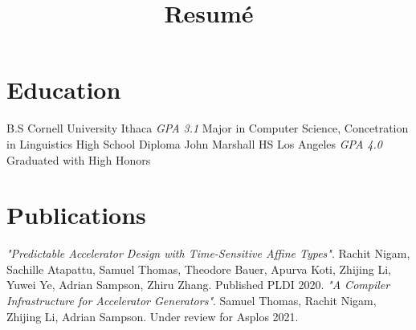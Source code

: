 \documentclass[10pt,a4paper,sans]{moderncv}        %
\title{Resumé}                                              %
\begin{document}
\makecvtitle

\section{Education}
{B.S}
{Cornell University}
{Ithaca}
{\textit{GPA 3.1}} %
{Major in Computer Science, Concetration in Linguistics}  %
%
{High School Diploma}
{John Marshall HS}
{Los Angeles}
{\textit{GPA 4.0}}
{Graduated with High Honors}

\section{Publications}
{\textit{"Predictable Accelerator Design with Time-Sensitive Affine Types"}.
  Rachit Nigam, Sachille Atapattu, Samuel Thomas, Theodore Bauer, Apurva Koti,
  Zhijing Li, Yuwei Ye, Adrian Sampson, Zhiru Zhang. Published PLDI 2020.}
{\textit{"A Compiler Infrastructure for Accelerator Generators"}.
  Samuel Thomas, Rachit Nigam, Zhijing Li, Adrian Sampson.
  Under review for Asplos 2021.}
\end{document}
